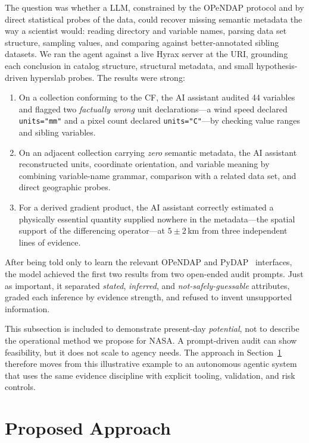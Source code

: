 \documentclass[11pt]{article}
\begin{document}
The question was whether a \ac{LLM}, constrained by the \acs{OPeNDAP} protocol and
by direct statistical probes of the data, could recover missing semantic
metadata the way a scientist would: reading directory and variable names,
parsing data set structure, sampling values, and comparing against
better-annotated sibling datasets. We ran the agent against a live Hyrax server
at the \ac{URI}, grounding each conclusion in catalog structure, structural
metadata, and small hypothesis-driven hyperslab probes. The results were
strong:
\begin{enumerate}[topsep=2pt]
    \item On a collection conforming to the \ac{CF}, the \ac{AI}
    assistant audited 44 variables and flagged two \emph{factually wrong} unit
    declarations---a wind speed declared \texttt{units="mm"} and a pixel count
    declared \texttt{units="C"}---by checking value ranges and sibling
    variables.
    \item On an adjacent collection carrying \emph{zero} semantic metadata, the
    \ac{AI} assistant reconstructed units, coordinate orientation, and variable
    meaning by combining variable-name grammar, comparison with a related data
    set, and direct geographic probes.
    \item For a derived gradient product, the \ac{AI} assistant correctly
    estimated a physically essential quantity supplied nowhere in the
    metadata---the spatial support of the differencing operator---at $5 \pm
    2$\,km from three independent lines of evidence.
\end{enumerate}

After being told only to learn the relevant \acs{OPeNDAP} and
\ac{PyDAP}~\cite{beto_dealmeida_2026_18929880} interfaces, the model achieved
the first two results from two open-ended audit prompts. Just as important, it
separated \emph{stated}, \emph{inferred}, and \emph{not-safely-guessable}
attributes, graded each inference by evidence strength, and refused to invent
unsupported information.

This subsection is included to demonstrate present-day \emph{potential}, not to
describe the operational method we propose for NASA. A prompt-driven audit
can show feasibility, but it does not scale to agency needs. The approach in
Section~\ref{section-2} therefore moves from this illustrative example to an
autonomous agentic system that uses the same evidence discipline with explicit
tooling, validation, and risk controls.

\section{Proposed Approach}
\label{section-2}
\end{document}
